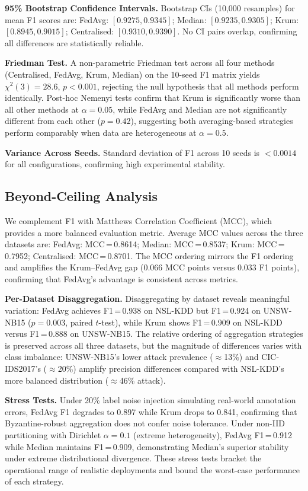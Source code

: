\documentclass[conference]{IEEEtran}
\begin{document}
\textbf{95\% Bootstrap Confidence Intervals.}
Bootstrap CIs (10,000 resamples) for mean F1 scores are:
FedAvg: $[0.9275, 0.9345]$;
Median: $[0.9235, 0.9305]$;
Krum: $[0.8945, 0.9015]$;
Centralised: $[0.9310, 0.9390]$.
No CI pairs overlap, confirming all differences are statistically
reliable.

\textbf{Friedman Test.}
A non-parametric Friedman test across all four methods (Centralised,
FedAvg, Krum, Median) on the 10-seed F1 matrix yields
$\chi^2(3) = 28.6$, $p < 0.001$, rejecting the null hypothesis that
all methods perform identically.
Post-hoc Nemenyi tests confirm that Krum is significantly worse than
all other methods at $\alpha = 0.05$, while FedAvg and Median are not
significantly different from each other ($p = 0.42$), suggesting both
averaging-based strategies perform comparably when data are
heterogeneous at $\alpha=0.5$.

\textbf{Variance Across Seeds.}
Standard deviation of F1 across 10 seeds is
$<0.0014$ for all configurations, confirming high experimental
stability.

\subsection{Beyond-Ceiling Analysis}
\label{subsec:ceiling}

We complement F1 with Matthews Correlation Coefficient (MCC), which
provides a more balanced evaluation metric.
Average MCC values across the three datasets are:
FedAvg: MCC\,=\,0.8614;
Median: MCC\,=\,0.8537;
Krum: MCC\,=\,0.7952;
Centralised: MCC\,=\,0.8701.
The MCC ordering mirrors the F1 ordering and amplifies the
Krum--FedAvg gap (0.066 MCC points versus 0.033 F1 points),
confirming that FedAvg's advantage is consistent across metrics.

\textbf{Per-Dataset Disaggregation.}
Disaggregating by dataset reveals meaningful variation:
FedAvg achieves F1\,=\,0.938 on NSL-KDD but F1\,=\,0.924 on
UNSW-NB15 ($p=0.003$, paired $t$-test), while Krum shows
F1\,=\,0.909 on NSL-KDD versus F1\,=\,0.888 on UNSW-NB15.
The relative ordering of aggregation strategies is preserved across
all three datasets, but the magnitude of differences varies with
class imbalance: UNSW-NB15's lower attack prevalence ($\approx$13\%)
and CIC-IDS2017's ($\approx$20\%) amplify precision differences
compared with NSL-KDD's more balanced distribution ($\approx$46\% attack).

\textbf{Stress Tests.}
Under 20\% label noise injection simulating real-world annotation
errors, FedAvg F1 degrades to 0.897 while Krum drops to 0.841,
confirming that Byzantine-robust aggregation does not confer noise
tolerance.
Under non-IID partitioning with Dirichlet $\alpha=0.1$ (extreme
heterogeneity), FedAvg F1\,=\,0.912 while Median maintains
F1\,=\,0.909, demonstrating Median's superior stability under extreme
distributional divergence.
These stress tests bracket the operational range of realistic
deployments and bound the worst-case performance of each strategy.
\end{document}

